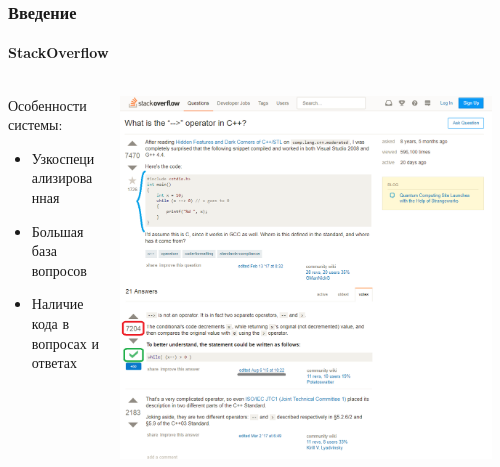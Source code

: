 \documentclass[10pt]{beamer}
\begin{document}

\begin{frame}
\frametitle{Введение}
\framesubtitle{StackOverflow}

\begin{columns}
    \begin{column}{0.4\textwidth}
    	Особенности системы:
    	\begin{itemize}
			\item Узкоспециализированная
			\item Большая база вопросов
			\item Наличие кода в вопросах и ответах
    	\end{itemize}
    \end{column}
    \begin{column}{0.6\textwidth}
        \begin{center}
            \includegraphics[width=0.95\textwidth]{images/stackoverflow_screen.png}
        \end{center}
    \end{column}
\end{columns}

\end{frame}

\end{document}

